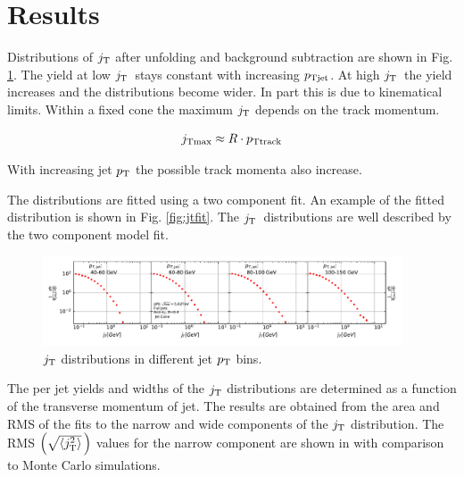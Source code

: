 \section{Results}
\label{sec:results}

Distributions of $j_{\rm T}$ after unfolding and background subtraction are shown in Fig. \ref{fig:jtdist}. The yield at low $j_{\rm T}$ stays constant with increasing $p_{\rm Tjet}$. At high $j_{\rm T}$ the yield increases and the distributions become wider. In part this is due to kinematical limits. Within a fixed cone the maximum $j_{\rm T}$ depends on the track momentum. 

$$j_{\rm Tmax} \approx R \cdot p_{\rm Ttrack}$$

With increasing jet $p_{\rm T}$ the possible track momenta also increase.

The distributions are fitted using a two component fit. An example of the fitted distribution is shown in Fig. \ref{fig:jtfit}. The $j_{\rm T}$ distributions are well described by the two component model fit. 

\begin{figure}[htb]
\begin{center}
\includegraphics[width=0.95\textwidth]{figures/results/MixedFullJetsR04JetConeJtSignalPtFrom4To8.pdf}
\caption{$j_{\rm T}$ distributions in different jet $p_{\rm T}$ bins.}
\label{fig:jtdist}
\end{center}
\end{figure}


The per jet yields and widths of the $j_{\rm T}$ distributions are determined as a function of the transverse momentum of jet. The results are obtained from the area and RMS of the fits to the narrow and wide components of the $j_{\rm T}$ distribution. The RMS $\left(\sqrt{\left<j_{\rm T}^2\right>}\,\right)$ values for the narrow component are shown in  with comparison to Monte Carlo simulations. 

